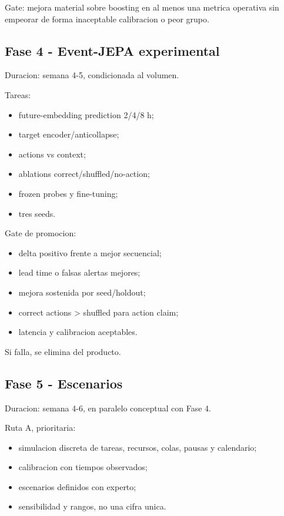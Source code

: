 \documentclass[
  spanish,
  10pt,
  a4paper,
]{article}
\providecommand{\tightlist}{%
  \setlength{\itemsep}{0pt}\setlength{\parskip}{0pt}}
\begin{document}
Gate: mejora material sobre boosting en al menos una metrica operativa
sin empeorar de forma inaceptable calibracion o peor grupo.

\subsection{Fase 4 - Event-JEPA
experimental}\label{fase-4---event-jepa-experimental}

Duracion: semana 4-5, condicionada al volumen.

Tareas:

\begin{itemize}
\tightlist
\item
  future-embedding prediction 2/4/8 h;
\item
  target encoder/anticollapse;
\item
  actions vs context;
\item
  ablations correct/shuffled/no-action;
\item
  frozen probes y fine-tuning;
\item
  tres seeds.
\end{itemize}

Gate de promocion:

\begin{itemize}
\tightlist
\item
  delta positivo frente a mejor secuencial;
\item
  lead time o falsas alertas mejores;
\item
  mejora sostenida por seed/holdout;
\item
  correct actions \textgreater{} shuffled para action claim;
\item
  latencia y calibracion aceptables.
\end{itemize}

Si falla, se elimina del producto.

\subsection{Fase 5 - Escenarios}\label{fase-5---escenarios}

Duracion: semana 4-6, en paralelo conceptual con Fase 4.

Ruta A, prioritaria:

\begin{itemize}
\tightlist
\item
  simulacion discreta de tareas, recursos, colas, pausas y calendario;
\item
  calibracion con tiempos observados;
\item
  escenarios definidos con experto;
\item
  sensibilidad y rangos, no una cifra unica.
\end{itemize}
\end{document}
